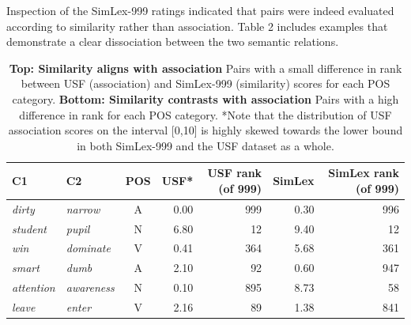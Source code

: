 Inspection of the SimLex-999 ratings indicated that pairs were indeed evaluated according to similarity rather than association. Table 2 includes examples that demonstrate a clear dissociation between the two semantic relations. 



 \begin{table}[t]\begin{center}\begin{tabular}{l|l|c|r|r|r|r}





C1 & C2 & POS & USF* & USF rank (of 999) & SimLex & SimLex rank (of 999) \\



\hline \emph{dirty} & \emph{narrow} & A & 0.00 & 999 & 0.30 & 996 \\



\emph{student} & \emph{pupil} & N & 6.80 & 12 & 9.40 & 12 \\

\emph{win} & \emph{dominate} & V & 0.41 & 364 & 5.68 & 361 \\



\hdashline \emph{smart} & \emph{dumb} & A & 2.10 & 92 & 0.60 & 947 \\

\emph{attention} & \emph{awareness} & N &  0.10 & 895 & 8.73 & 58 \\

\emph{leave} & \emph{enter} & V & 2.16 & 89 & 1.38 & 841 \\
\end{tabular}
\end{center}\caption{\label{font-table} {\bf Top:  Similarity aligns with association} Pairs with a small difference in rank between USF (association) and SimLex-999 (similarity) scores for each POS category. {\bf Bottom: Similarity contrasts with association} Pairs with a high difference in rank for each POS category. *Note that the distribution of USF association scores on the interval [0,10] is highly skewed towards the lower bound in both SimLex-999 and the USF dataset as a whole.}\end{table}

